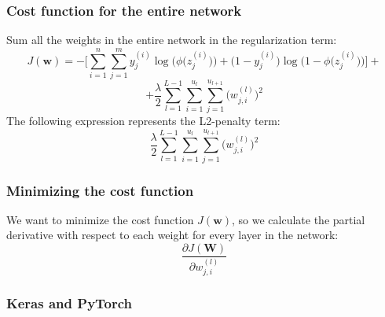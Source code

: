 \documentclass{beamer}
\begin{document}
\begin{frame}
  \frametitle{Cost function for the entire network}
  Sum all the weights in the entire network in the regularization term:
  \[
  J(\mathbf{w}) = - \Bigg[ \sum_{i=1}^{n} \sum_{j=1}^{m} y_{j}^{(i)}  \log \bigg( \phi \Big( z_{j}^{(i)} \Big) \bigg) + \Big(1 - y_{j}^{(i)} \Big) \log  \bigg(1 - \phi \Big( z_{j}^{(i)} \Big)  \bigg) \Bigg] +
  \]
  \[
  + \frac{\lambda}{2} \sum_{l=1}^{L-1} \sum_{i=1}^{u_l} \sum_{j=1}^{u_{l+1}} \Big(w_{j, i}^{(l)}\Big)^2
  \]
  The following expression represents the L2-penalty term:
  \[
  \frac{\lambda}{2} \sum_{l=1}^{L-1} \sum_{i=1}^{u_l} \sum_{j=1}^{u_{l+1}} \Big(w_{j, i}^{(l)}\Big)^2
  \]
\end{frame}

\begin{frame}
  \frametitle{Minimizing the cost function}
  We want to minimize the cost function $J(\mathbf{w})$, so we calculate the partial derivative with respect to each weight for every layer in the network:
  \[
  \frac{\partial J(\mathbf{W})}{\partial w_{j, i}^{(l)}}
  \]
\end{frame}

\begin{frame}
  \frametitle{Keras and PyTorch}
  \href{https://github.com/fchollet/deep-learning-with-python-notebooks}{} \\
  \href{https://nbviewer.jupyter.org/github/fchollet/deep-learning-with-python-notebooks/blob/master/3.5-classifying-movie-reviews.ipynb}{} \\
  \href{https://towardsdatascience.com/understanding-pytorch-with-an-example-a-step-by-step-tutorial-81fc5f8c4e8e}{}
\end{frame}
\end{document}

